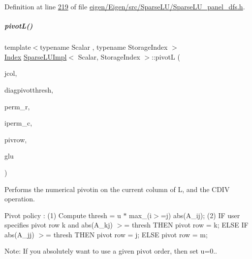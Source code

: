 Definition at line \hyperlink{eigen_2_eigen_2src_2_sparse_l_u_2_sparse_l_u__panel__dfs_8h_source_l00219}{219} of file \hyperlink{eigen_2_eigen_2src_2_sparse_l_u_2_sparse_l_u__panel__dfs_8h_source}{eigen/\+Eigen/src/\+Sparse\+L\+U/\+Sparse\+L\+U\+\_\+panel\+\_\+dfs.\+h}.

\mbox{\label{group___sparse_l_u___module_ab5f56947465b829f8d523575724c3ac6}} 
\subparagraph{\texorpdfstring{pivot\+L()}{pivotL()}}
{\footnotesize\ttfamily template$<$typename Scalar , typename Storage\+Index $>$ \\
\hyperlink{namespace_eigen_a62e77e0933482dafde8fe197d9a2cfde}{Index} \hyperlink{group___sparse_l_u___module_class_eigen_1_1internal_1_1_sparse_l_u_impl}{Sparse\+L\+U\+Impl}$<$ Scalar, Storage\+Index $>$\+::pivotL (\begin{DoxyParamCaption}\item[{const \hyperlink{namespace_eigen_a62e77e0933482dafde8fe197d9a2cfde}{Index}}]{jcol,  }\item[{const Real\+Scalar \&}]{diagpivotthresh,  }\item[{\hyperlink{group___core___module}{Index\+Vector} \&}]{perm\+\_\+r,  }\item[{\hyperlink{group___core___module}{Index\+Vector} \&}]{iperm\+\_\+c,  }\item[{\hyperlink{namespace_eigen_a62e77e0933482dafde8fe197d9a2cfde}{Index} \&}]{pivrow,  }\item[{\hyperlink{struct_eigen_1_1internal_1_1_l_u___global_l_u__t}{Global\+L\+U\+\_\+t} \&}]{glu }\end{DoxyParamCaption})\hspace{0.3cm}{\ttfamily [protected]}}



Performs the numerical pivotin on the current column of L, and the C\+D\+IV operation. 

Pivot policy \+: (1) Compute thresh = u $\ast$ max\+\_\+(i$>$=j) abs(\+A\+\_\+ij); (2) IF user specifies pivot row k and abs(\+A\+\_\+kj) $>$= thresh T\+H\+EN pivot row = k; E\+L\+SE IF abs(\+A\+\_\+jj) $>$= thresh T\+H\+EN pivot row = j; E\+L\+SE pivot row = m;

Note\+: If you absolutely want to use a given pivot order, then set u=0..


